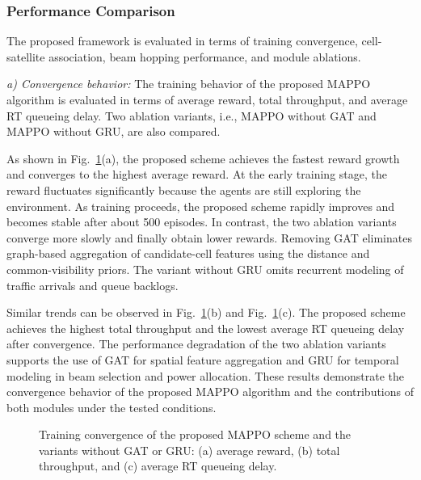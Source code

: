 \documentclass[journal]{IEEEtran}
\begin{document}
\subsubsection{Performance Comparison}
The proposed framework is evaluated in terms of training convergence, cell-satellite association, beam hopping performance, and module ablations.

\textit{a) Convergence behavior:}
The training behavior of the proposed MAPPO algorithm is evaluated in terms of average reward, total throughput, and average RT queueing delay. Two ablation variants, i.e., MAPPO without GAT and MAPPO without GRU, are also compared.

As shown in Fig.~\ref{fig:training-metrics}(a), the proposed scheme achieves the fastest reward growth and converges to the highest average reward. At the early training stage, the reward fluctuates significantly because the agents are still exploring the environment. As training proceeds, the proposed scheme rapidly improves and becomes stable after about 500 episodes. In contrast, the two ablation variants converge more slowly and finally obtain lower rewards. Removing GAT eliminates graph-based aggregation of candidate-cell features using the distance and common-visibility priors. The variant without GRU omits recurrent modeling of traffic arrivals and queue backlogs.

Similar trends can be observed in Fig.~\ref{fig:training-metrics}(b) and Fig.~\ref{fig:training-metrics}(c). The proposed scheme achieves the highest total throughput and the lowest average RT queueing delay after convergence. The performance degradation of the two ablation variants supports the use of GAT for spatial feature aggregation and GRU for temporal modeling in beam selection and power allocation. These results demonstrate the convergence behavior of the proposed MAPPO algorithm and the contributions of both modules under the tested conditions.

\begin{figure}[!t]
\centering

\caption{Training convergence of the proposed MAPPO scheme and the variants without GAT or GRU: (a) average reward, (b) total throughput, and (c) average RT queueing delay.}
\label{fig:training-metrics}
\end{figure}
\end{document}
